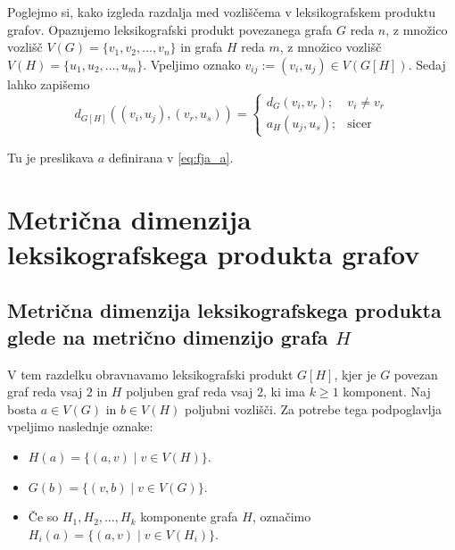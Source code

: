 \documentclass[mat1, tisk]{fmfdelo}
\newcommand{\1}{(1, 1, \ldots, 1)}
\newcommand{\2}{(2, 2, \ldots, 2)}
\begin{document}
Poglejmo si, kako izgleda razdalja med vozliščema v leksikografskem produktu grafov. 
Opazujemo leksikografski produkt povezanega grafa $G$ reda $n$, z množico vozlišč
$V(G) = \{v_1, v_2, \ldots , v_n \}$ in grafa $H$ reda $m$, z množico vozlišč 
$V(H) = \{u_1, u_2, \ldots , u_m \}$. Vpeljimo oznako 
$v_{ij} := (v_i, u_j) \in V(G[H]).$
Sedaj lahko zapišemo
\begin{equation} \label{eq:razdalja_produkta}
    d_{G[H]}((v_i, u_j), (v_r, u_s)) = 
    \begin{cases}
        d_G(v_i, v_r); & v_i \neq v_r \\
        a_H(u_j, u_s); & \text{sicer}
    \end{cases}
\end{equation} 

Tu je preslikava $a$ definirana v \eqref{eq:fja_a}.




\section{Metrična dimenzija leksikografskega produkta grafov}\label{s:mdim_prod}



\subsection{Metrična dimenzija leksikografskega produkta glede na metrično 
dimenzijo grafa $H$} \label{ss:mdim_komp_prod}

V tem razdelku obravnavamo leksikografski produkt $G[H]$, kjer je $G$ povezan graf reda vsaj $2$ 
in $H$ poljuben graf reda vsaj $2$, ki ima $k\geq 1$ komponent. 
Naj bosta $a \in V(G)$ in $b \in V(H)$ poljubni vozlišči. 
Za potrebe tega podpoglavlja vpeljimo naslednje oznake:
\begin{itemize}
    \item $H(a) = \{ (a, v) \; | \; v \in V(H) \}$.
    \item $G(b) = \{ (v, b) \; | \; v \in V(G) \}$.
    \item Če so $H_1, H_2, \ldots , H_k$ komponente grafa $H$, označimo 
    $H_i(a) = \{ (a, v) \; | \; v \in V(H_i) \}$.
\end{itemize}
\end{document}
